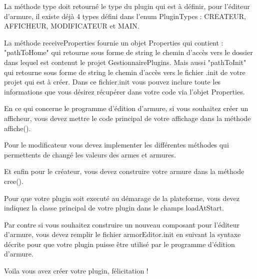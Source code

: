 La méthode type doit retourné le type du plugin qui est à définir, pour l'éditeur d'armure, il existe déjà 4 types défini dans l'enum PluginTypes : CREATEUR, AFFICHEUR, MODIFICATEUR et MAIN.

La méthode receiveProperties fournie un objet Properties qui contient : "pathToHome" qui retourne sous forme de string le chemin d'accès vers le dossier dans lequel est contenut le projet GestionnairePlugins. Mais aussi "pathToInit" qui retourne sous forme de string le chemin d'accès vers le fichier .init de votre projet qui est à créer. Dans ce fichier.init vous pouvez inclure toute les informations que vous désirez récupérer dans votre code via l'objet Properties.
\vspace{0.5cm}

En ce qui concerne le programme d'édition d'armure, si vous souhaitez créer un afficheur, vous devez mettre le code principal de votre affichage dans la méthode affiche().

Pour le modificateur vous devez implementer les différentes méthodes qui permettents de changé les valeurs des armes et armures.

Et enfin pour le créateur, vous devez construire votre armure dans la méthode cree().
\vspace{0.5cm}

Pour que votre plugin soit executé au démarage de la plateforme, vous devez indiquez la classe principal de votre plugin dans le champs loadAtStart.

Par contre si vous souhaitez construire un nouveau composant pour l'éditeur d'armure, vous devez remplir le fichier armorEditor.init en suivant la syntaxe décrite pour que votre plugin puisse être utilisé par le programme d'édition d'armure.
\vspace{0.5cm}

Voila vous avez créer votre plugin, félicitation !

